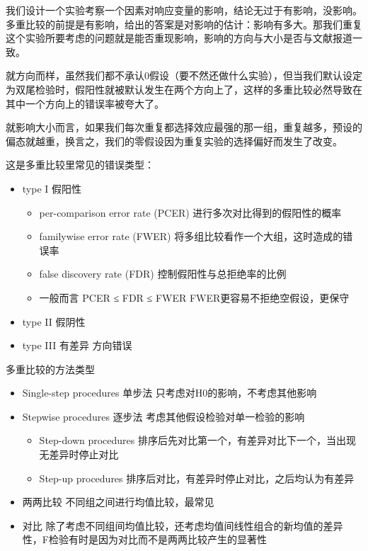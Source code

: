 \documentclass[]{tufte-book}
\providecommand{\tightlist}{%
  \setlength{\itemsep}{0pt}\setlength{\parskip}{0pt}}
\begin{document}
我们设计一个实验考察一个因素对响应变量的影响，结论无过于有影响，没影响。多重比较的前提是有影响，给出的答案是对影响的估计：影响有多大。那我们重复这个实验所要考虑的问题就是能否重现影响，影响的方向与大小是否与文献报道一致。

就方向而样，虽然我们都不承认0假设（要不然还做什么实验），但当我们默认设定为双尾检验时，假阳性就被默认发生在两个方向上了，这样的多重比较必然导致在其中一个方向上的错误率被夸大了。

就影响大小而言，如果我们每次重复都选择效应最强的那一组，重复越多，预设的偏态就越重，换言之，我们的零假设因为重复实验的选择偏好而发生了改变。

这是多重比较里常见的错误类型：

\begin{itemize}
\tightlist
\item
  type I 假阳性

  \begin{itemize}
  \tightlist
  \item
    per-comparison error rate (PCER) 进行多次对比得到的假阳性的概率
  \item
    familywise error rate (FWER) 将多组比较看作一个大组，这时造成的错误率
  \item
    false discovery rate (FDR) 控制假阳性与总拒绝率的比例
  \item
    一般而言 PCER ≤ FDR ≤ FWER FWER更容易不拒绝空假设，更保守
  \end{itemize}
\item
  type II 假阴性
\item
  type III 有差异 方向错误
\end{itemize}

多重比较的方法类型

\begin{itemize}
\tightlist
\item
  Single-step procedures 单步法 只考虑对H0的影响，不考虑其他影响
\item
  Stepwise procedures 逐步法 考虑其他假设检验对单一检验的影响

  \begin{itemize}
  \tightlist
  \item
    Step-down procedures 排序后先对比第一个，有差异对比下一个，当出现无差异时停止对比
  \item
    Step-up procedures 排序后对比，有差异时停止对比，之后均认为有差异
  \end{itemize}
\item
  两两比较 不同组之间进行均值比较，最常见
\item
  对比 除了考虑不同组间均值比较，还考虑均值间线性组合的新均值的差异性，F检验有时是因为对比而不是两两比较产生的显著性
\end{itemize}
\end{document}
